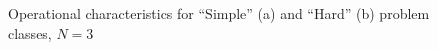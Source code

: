 \documentclass[review]{elsarticle}
\begin{document}
\begin{figure}[h!]
	\begin{minipage}[h]{0.48\linewidth}
	\end{minipage}
	\hfill
	\begin{minipage}[h]{0.48\linewidth}
	\end{minipage}
	\caption{Operational characteristics for “Simple” (a) and “Hard” (b) problem classes, $N = 3$}
	\label{fig:operational_characteristics_N=3}
\end{figure}
\end{document}
